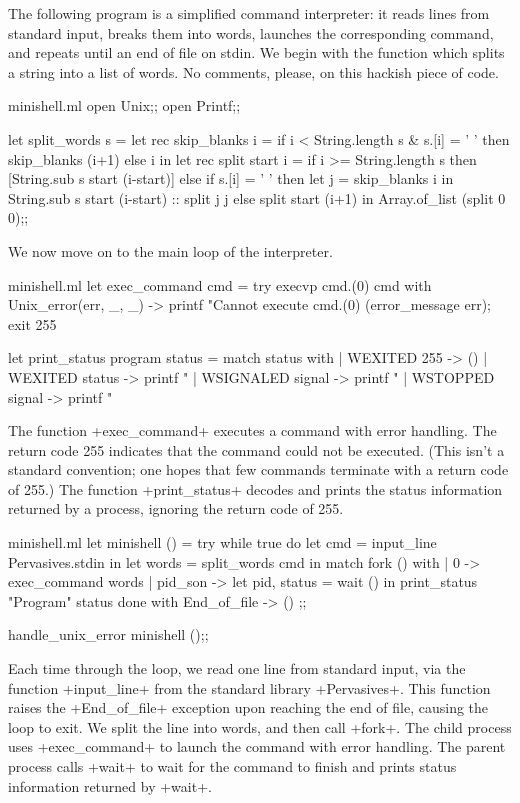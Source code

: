The following program is a simplified command interpreter: it reads
lines from standard input, breaks them into words, launches the
corresponding command, and repeats until an end of file on stdin.  We
begin with the function which splits a string into a list of words.
No comments, please, on this hackish piece of code.
\begin{listingcodefile}{minishell.ml}
open Unix;;
open Printf;;

let split_words s =
 let rec skip_blanks i =
   if i < String.length s & s.[i] = ' '
   then skip_blanks (i+1)
   else i in
 let rec split start i =
   if i >= String.length s then
     [String.sub s start (i-start)]
   else if s.[i] = ' ' then
     let j = skip_blanks i in
     String.sub s start (i-start) :: split j j
   else
     split start (i+1) in
 Array.of_list (split 0 0);;
\end{listingcodefile}
%
We now move on to the main loop of the interpreter.
%
\begin{listingcodefile}{minishell.ml}
let exec_command cmd =
 try execvp cmd.(0) cmd
 with Unix_error(err, _, _) ->
   printf "Cannot execute %
     cmd.(0) (error_message err);
   exit 255

let print_status program status =
 match status with
 | WEXITED 255 -> ()
 | WEXITED status ->
     printf "%
 | WSIGNALED signal ->
     printf "%
 | WSTOPPED signal ->
     printf "%
\end{listingcodefile}
%
The function \ml+exec_command+ executes a command with error handling.
The return code 255 indicates that the command could not be executed.
(This isn't a standard convention; one hopes that few commands
terminate with a return code of 255.)  The function
\ml+print_status+ decodes and prints the status information returned
by a process, ignoring the return code of 255.
%
\begin{listingcodefile}{minishell.ml}
let minishell () =
 try
   while true do
     let cmd = input_line Pervasives.stdin in
     let words = split_words cmd in
     match fork () with
     | 0 -> exec_command words
     | pid_son ->
         let pid, status = wait () in
         print_status "Program" status
   done
 with End_of_file -> ()
;;

handle_unix_error minishell ();;
\end{listingcodefile}
%
Each time through the loop, we read one line from standard input, via
the function \ml+input_line+ from the standard library
\ml+Pervasives+. This function raises the \ml+End_of_file+ exception
upon reaching the end of file, causing the loop to exit. We split the
line into words, and then call \ml+fork+.  The child process uses
\ml+exec_command+ to launch the command with error handling.  The
parent process calls \ml+wait+ to wait for the command to finish and
prints status information returned by \ml+wait+.

